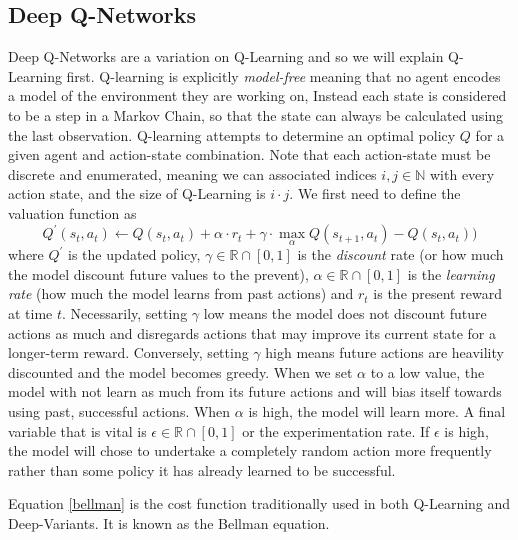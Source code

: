 \documentclass[doc, onecolumn, 12pt]{apa6}
\begin{document}
\subsection{Deep Q-Networks}
Deep Q-Networks are a variation on Q-Learning and so we will explain Q-Learning first. Q-learning is explicitly \emph{model-free} meaning that no agent encodes a model of the environment they are working on, Instead each state is considered to be a step in a Markov Chain, so that the state can always be calculated using the last observation. Q-learning attempts to determine an optimal policy $Q$ for a given agent and action-state combination. Note that each action-state must be discrete and enumerated, meaning we can associated indices $i, j \in \mathbb{N}$ with every action state, and the size of Q-Learning is $i \cdot j$. We first need to define the valuation function as 
\begin{equation} 
\label{bellman}
Q^{\prime}(s_{t}, a_{t}) \leftarrow Q(s_{t}, a_{t}) + \alpha \cdot r_{t} + \gamma \cdot \max_{\alpha} Q(s_{t+1}, a_{t}) - Q(s_{t}, a_{t}))  
\end{equation}  where $Q^{\prime}$ is the updated policy, $\gamma \in \mathbb{R} \cap [0,1]$ is the \emph{discount} rate (or how much the model discount future values to the prevent), $\alpha \in \mathbb{R} \cap [0,1]$ is the \emph{learning rate} (how much the model learns from past actions) and $r_{t}$ is the present reward at time $t$.  Necessarily, setting $\gamma$ low means the model does not discount future actions as much and disregards actions that may improve its current state for a longer-term reward. Conversely, setting $\gamma$ high means future actions are heavility discounted and the model becomes greedy. When we set $\alpha$ to a low value, the model with not learn as much from its future actions and will bias itself towards using past, successful actions. When $\alpha$ is high, the model will learn more. A final variable that is vital is $\epsilon \in \mathbb{R} \cap [0,1]$ or the experimentation rate. If $\epsilon$ is high, the model will chose to undertake a completely random action more frequently rather than some policy it has already learned to be successful. 

Equation \ref{bellman} is the cost function traditionally used in both Q-Learning and Deep-Variants. It is known as the Bellman equation. 
\end{document}
